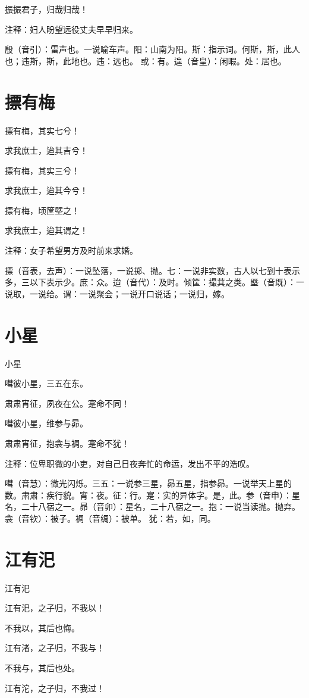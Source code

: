 \documentclass[12pt,UTF8]{ctexbook}
\begin{document}
振振君子，归哉归哉！

注释：妇人盼望远役丈夫早早归来。

殷（音引）：雷声也。一说喻车声。阳：山南为阳。斯：指示词。何斯，斯，此人也；违斯，斯，此地也。违：远也。 或：有。遑（音皇）：闲暇。处：居也。
\chapter{摽有梅}

摽有梅，其实七兮！

求我庶士，迨其吉兮！

摽有梅，其实三兮！

求我庶士，迨其今兮！

摽有梅，顷筐塈之！

求我庶士，迨其谓之！

注释：女子希望男方及时前来求婚。

摽（音表，去声）：一说坠落，一说掷、抛。七：一说非实数，古人以七到十表示多，三以下表示少。庶：众。迨（音代）：及时。倾筐：撮萁之类。塈（音既）：一说取，一说给。谓：一说聚会；一说开口说话；一说归，嫁。


\chapter{小星}
小星

嘒彼小星，三五在东。

肃肃宵征，夙夜在公。寔命不同！

嘒彼小星，维参与昴。

肃肃宵征，抱衾与裯。寔命不犹！

注释：位卑职微的小吏，对自己日夜奔忙的命运，发出不平的浩叹。

嘒（音慧）：微光闪烁。三五：一说参三星，昴五星，指参昴。一说举天上星的数。肃肃：疾行貌。宵：夜。征：行。寔：实的异体字。是，此。参（音申）：星名，二十八宿之一。昴（音卯）：星名，二十八宿之一。抱：一说当读抛。抛弃。衾（音钦）：被子。裯（音绸）：被单。 犹：若，如，同。

\chapter{江有汜}
江有汜

江有汜，之子归，不我以！

不我以，其后也悔。

江有渚，之子归，不我与！

不我与，其后也处。

江有沱，之子归，不我过！
\end{document}
